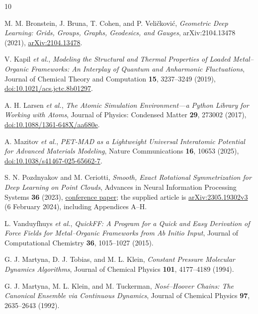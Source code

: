 \documentclass[10pt,a4paper,twocolumn]{article}
\begin{document}
\begin{thebibliography}{10}

M. M. Bronstein, J. Bruna, T. Cohen, and P. Veli\v{c}kovi\'c,
\emph{Geometric Deep Learning: Grids, Groups, Graphs, Geodesics, and Gauges},
arXiv:2104.13478 (2021),
\href{https://arxiv.org/abs/2104.13478}{arXiv:2104.13478}.

V. Kapil \emph{et al.},
\emph{Modeling the Structural and Thermal Properties of Loaded
Metal--Organic Frameworks: An Interplay of Quantum and Anharmonic
Fluctuations}, Journal of Chemical Theory and Computation \textbf{15},
3237--3249 (2019),
\href{https://doi.org/10.1021/acs.jctc.8b01297}{doi:10.1021/acs.jctc.8b01297}.

A. H. Larsen \emph{et al.},
\emph{The Atomic Simulation Environment---a Python Library for Working with
Atoms}, Journal of Physics: Condensed Matter \textbf{29}, 273002 (2017),
\href{https://doi.org/10.1088/1361-648X/aa680e}{doi:10.1088/1361-648X/aa680e}.

A. Mazitov \emph{et al.},
\emph{PET-MAD as a Lightweight Universal Interatomic Potential for Advanced
Materials Modeling}, Nature Communications \textbf{16}, 10653 (2025),
\href{https://doi.org/10.1038/s41467-025-65662-7}{doi:10.1038/s41467-025-65662-7}.

S. N. Pozdnyakov and M. Ceriotti,
\emph{Smooth, Exact Rotational Symmetrization for Deep Learning on Point
Clouds}, Advances in Neural Information Processing Systems \textbf{36}
(2023),
\href{https://proceedings.neurips.cc/paper_files/paper/2023/hash/fb4a7e3522363907b26a86cc5be627ac-Abstract-Conference.html}{conference paper};
the supplied article is
\href{https://arxiv.org/abs/2305.19302v3}{arXiv:2305.19302v3}
(6 February 2024), including Appendices A--H.

L. Vanduyfhuys \emph{et al.},
\emph{QuickFF: A Program for a Quick and Easy Derivation of Force Fields for
Metal--Organic Frameworks from Ab Initio Input}, Journal of Computational
Chemistry \textbf{36}, 1015--1027 (2015).

G. J. Martyna, D. J. Tobias, and M. L. Klein,
\emph{Constant Pressure Molecular Dynamics Algorithms}, Journal of Chemical
Physics \textbf{101}, 4177--4189 (1994).

G. J. Martyna, M. L. Klein, and M. Tuckerman,
\emph{Nos\'e--Hoover Chains: The Canonical Ensemble via Continuous Dynamics},
Journal of Chemical Physics \textbf{97}, 2635--2643 (1992).


\end{thebibliography}
\end{document}
